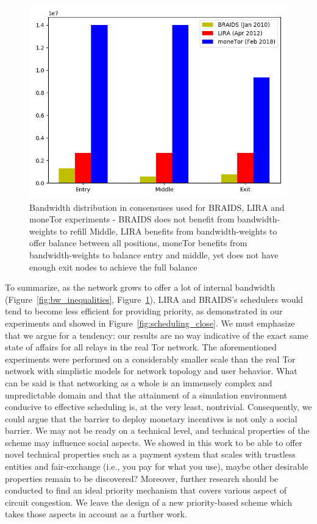 \begin{figure}
	\centering \includegraphics[scale=0.415]{images/bw_analysis_comp.png}
  \caption{Bandwidth distribution in consensuses used for BRAIDS, LIRA and moneTor experiments - BRAIDS does not benefit from bandwidth-weights to refill Middle, LIRA benefits from bandwidth-weights to offer balance between all positions, moneTor benefits from bandwidth-weights to balance entry and middle, yet does not have enough exit nodes to achieve the full balance}
  \label{fig:bw_comp}
\end{figure}
 
To summarize, as the network grows to offer a lot of internal bandwidth (Figure~\ref{fig:bw_inequalities}, Figure~\ref{fig:bw_comp}), LIRA and BRAIDS's schedulers would tend to become less efficient for providing priority, as demonstrated in our experiments and showed in Figure~\ref{fig:scheduling_close}.
We must emphasize that we argue for a tendency: our results are no way indicative of the exact same state of affairs for all relays in the real Tor network.
The aforementioned experiments were performed on a considerably smaller scale than the real Tor network with simplistic models for network topology and user behavior.
What can be said is that networking as a whole is an immensely complex and unpredictable domain and that the attainment of a simulation environment conducive to effective scheduling is, at the very least, nontrivial.
Consequently, we could argue that the barrier to deploy monetary incentives is not only a social barrier.
We may not be ready on a technical level, and technical properties of the scheme may influence social aspects.
We showed in this work to be able to offer novel technical properties such as a payment system that scales with trustless entities and fair-exchange (i.e., you pay for what you use), maybe other desirable properties remain to be discovered?
Moreover, further research should be conducted to find an ideal priority mechanism that covers various aspect of circuit congestion.
We leave the design of a new priority-based scheme which takes those aspects in account as a further work.
